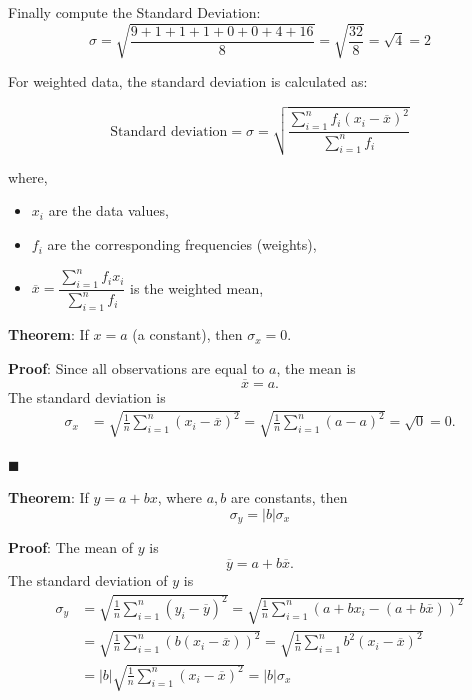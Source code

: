 \documentclass[twoside]{book}
\begin{document}
\begin{enumerate}
Finally compute the Standard Deviation:
\[
\sigma = \sqrt{\frac{9 + 1 + 1 + 1 + 0 + 0 + 4 + 16}{8}} = \sqrt{\frac{32}{8}} = \sqrt{4} = 2
\]

For weighted data, the standard deviation is calculated as:

\begin{textbox}
\[
\text{Standard deviation} = \sigma = \sqrt{\frac{\sum_{i=1}^n f_i (x_i - \overline{x})^2}{\sum_{i=1}^n f_i}}
\]
\end{textbox}

where,  
\begin{itemize}
    \item \(x_i\) are the data values,  
    \item \(f_i\) are the corresponding frequencies (weights),  
    \item \(\overline{x} = \dfrac{\sum_{i=1}^n f_i x_i}{\sum_{i=1}^n f_i}\) is the weighted mean,  
\end{itemize}

\begin{textbox}
\textbf{Theorem}: If \( x = a \) (a constant), {then } \( \sigma_x = 0 \).
\end{textbox}

\textbf{Proof}: Since all observations are equal to \( a \), the mean is
\[
\overline{x} = a.
\]
The standard deviation is
\begin{align*}
\sigma_x &= \sqrt{\frac{1}{n} \sum_{i=1}^n (x_i - \overline{x})^2} = \sqrt{\frac{1}{n} \sum_{i=1}^n (a - a)^2} = \sqrt{0} = 0.
\end{align*}

\hfill $\blacksquare$

\begin{textbox}
\textbf{Theorem}: If \( y = a + b x \), {where} \( a, b \) {are constants, then}
\[
\sigma_y = |b| \sigma_x
\]
\end{textbox}

\textbf{Proof}: The mean of \( y \) is
\[
\overline{y} = a + b \overline{x}.
\]
The standard deviation of \( y \) is
\begin{align*}
\sigma_y &= \sqrt{\frac{1}{n} \sum_{i=1}^n (y_i - \overline{y})^2} = \sqrt{\frac{1}{n} \sum_{i=1}^n (a + b x_i - (a + b \overline{x}))^2} \\
         &= \sqrt{\frac{1}{n} \sum_{i=1}^n \left(b (x_i - \overline{x})\right)^2} = \sqrt{\frac{1}{n} \sum_{i=1}^n b^2 (x_i - \overline{x})^2} \\
         &= |b| \sqrt{\frac{1}{n} \sum_{i=1}^n (x_i - \overline{x})^2} = |b| \sigma_x
\end{align*}


\end{enumerate}
\end{document}
